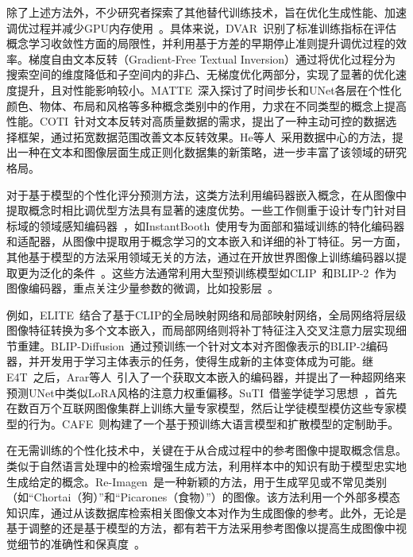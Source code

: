 除了上述方法外，不少研究者探索了其他替代训练技术，旨在优化生成性能、加速调优过程并减少GPU内存使用~\cite{voronov2023loss,fei2023gradient,agarwal2023image,yang2023controllable,he2023data,zhao2023catversion}。具体来说，DVAR~\cite{voronov2023loss}识别了标准训练指标在评估概念学习收敛性方面的局限性，并利用基于方差的早期停止准则提升调优过程的效率。梯度自由文本反转（Gradient-Free Textual Inversion）\cite{fei2023gradient}通过将优化过程分为搜索空间的维度降低和子空间内的非凸、无梯度优化两部分，实现了显著的优化速度提升，且对性能影响较小。MATTE~\cite{agarwal2023image}深入探讨了时间步长和UNet各层在个性化颜色、物体、布局和风格等多种概念类别中的作用，力求在不同类型的概念上提高性能。COTI~\cite{yang2023controllable}针对文本反转对高质量数据的需求，提出了一种主动可控的数据选择框架，通过拓宽数据范围改善文本反转效果。He等人~\cite{he2023data}采用数据中心的方法，提出一种在文本和图像层面生成正则化数据集的新策略，进一步丰富了该领域的研究格局。

对于基于模型的个性化评分预测方法，这类方法利用编码器嵌入概念，在从图像中提取概念时相比调优型方法具有显著的速度优势。一些工作侧重于设计专门针对目标域的领域感知编码器~\cite{gal2023designing,shi2023instantbooth}，如InstantBooth~\cite{shi2023instantbooth}使用专为面部和猫域训练的特化编码器和适配器，从图像中提取用于概念学习的文本嵌入和详细的补丁特征。另一方面，其他基于模型的方法采用领域无关的方法，通过在开放世界图像上训练编码器以提取更为泛化的条件~\cite{wei2023elite,ma2023unified,chen2023subject,arar2023domain,ma2023subject,zhao2023videoassembler,jiang2023videobooth,pan2023kosmos}。这些方法通常利用大型预训练模型如CLIP~\cite{radford2021learning}和BLIP-2~\cite{Li2023BLIP2BL}作为图像编码器，重点关注少量参数的微调，比如投影层~\cite{wei2023elite,ma2023unified,hua2023dreamtuner,arar2023domain}。

例如，ELITE~\cite{wei2023elite}结合了基于CLIP的全局映射网络和局部映射网络，全局网络将层级图像特征转换为多个文本嵌入，而局部网络则将补丁特征注入交叉注意力层实现细节重建。BLIP-Diffusion~\cite{li2023blip}通过预训练一个针对文本对齐图像表示的BLIP-2编码器，并开发用于学习主体表示的任务，使得生成新的主体变体成为可能。继E4T~\cite{gal2023designing}之后，Arar等人~\cite{arar2023domain}引入了一个获取文本嵌入的编码器，并提出了一种超网络来预测UNet中类似LoRA风格的注意力权重偏移。SuTI~\cite{chen2023subject}借鉴学徒学习思想~\cite{abbeel2004apprenticeship}，首先在数百万个互联网图像集群上训练大量专家模型，然后让学徒模型模仿这些专家模型的行为。CAFE~\cite{zhou2023customization}则构建了一个基于预训练大语言模型和扩散模型的定制助手。

在无需训练的个性化技术中，关键在于从合成过程中的参考图像中提取概念信息。类似于自然语言处理中的检索增强生成方法，利用样本中的知识有助于模型忠实地生成给定的概念。Re-Imagen~\cite{chen2022re}是一种新颖的方法，用于生成罕见或不常见类别（如“Chortai（狗）”和“Picarones（食物）”）的图像。该方法利用一个外部多模态知识库，通过从该数据库检索相关图像文本对作为生成图像的参考。此外，无论是基于调整的还是基于模型的方法，都有若干方法采用参考图像以提高生成图像中视觉细节的准确性和保真度~\cite{wang2023hifi,zhao2023videoassembler,tang2023retrieving}。


